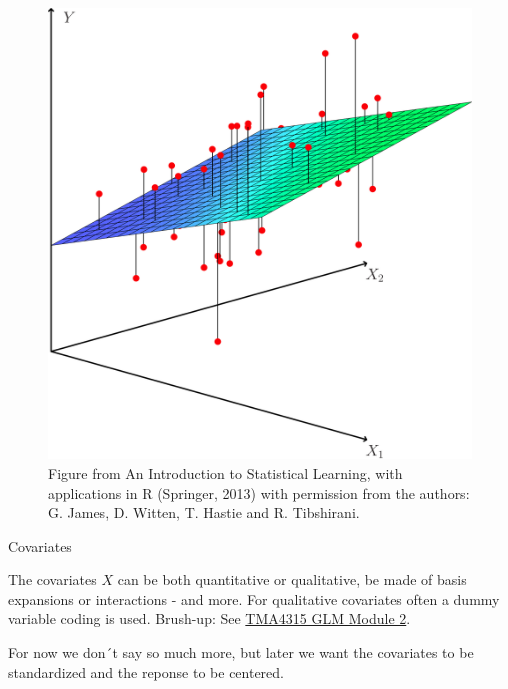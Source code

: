 \documentclass[
  ignorenonframetext,
]{beamer}
\begin{document}
\begin{frame}

\begin{figure}
\includegraphics[width=0.5\linewidth]{./ILS34} \caption{Figure from An Introduction to Statistical Learning, with applications in R (Springer, 2013) with permission from the authors: G. James, D. Witten, T. Hastie and R. Tibshirani.}\label{fig:unnamed-chunk-2}
\end{figure}

\end{frame}

\begin{frame}

\begin{block}{Covariates}

The covariates \(X\) can be both quantitative or qualitative, be made of
basis expansions or interactions - and more. For qualitative covariates
often a dummy variable coding is used. Brush-up: See
\href{https://www.math.ntnu.no/emner/TMA4315/2018h/2MLR.html\#categorical_covariates_-_dummy_and_effect_coding}{TMA4315
GLM Module 2}.

For now we don´t say so much more, but later we want the covariates to
be standardized and the reponse to be centered.

\end{block}

\end{frame}
\end{document}
